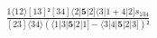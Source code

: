 \documentclass[varwidth, border=5pt]{standalone}
\begin{document}
\begin{my}
$\begin{gathered}
\scriptscriptstyle\frac{1⟨12⟩[13]²[34]⟨2|𝟓|2]⟨3|1+4|2]s_{134}}{[23]⟨34⟩(⟨1|3|𝟓|2|1]-⟨3|4|𝟓|2|3])²}
\end{gathered}$
\end{my}
\end{document}

